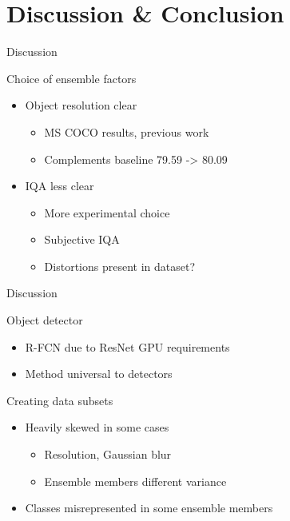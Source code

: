\section{Discussion \& Conclusion}
\begin{frame}{Discussion}{}
    \begin{block}{Choice of ensemble factors}
    \begin{itemize}
        \item Object resolution clear
        \begin{itemize}
            \item MS COCO results, previous work
            \item Complements baseline 79.59 -> 80.09
        \end{itemize}
        \item IQA less clear
        \begin{itemize}
            \item More experimental choice
            \item Subjective IQA
            \item Distortions present in dataset?
        \end{itemize}
    \end{itemize}  
\end{block} 
\end{frame}

\begin{frame}{Discussion}{}
    \begin{block}{Object detector}
        \begin{itemize}
            \item R-FCN due to ResNet GPU requirements
            \item Method universal to detectors 
        \end{itemize} 
    \end{block} 
    \begin{block}{Creating data subsets}
        \begin{itemize}
            \item Heavily skewed in some cases
            \begin{itemize}
                \item Resolution, Gaussian blur
                \item Ensemble members different variance
            \end{itemize}
            \item Classes misrepresented in some ensemble members
        \end{itemize} 
    \end{block}
\end{frame}


